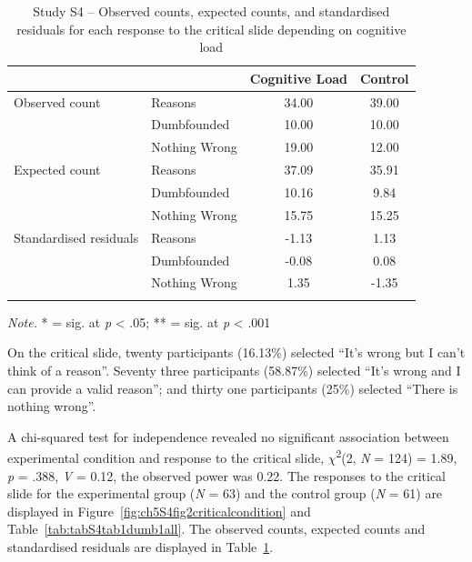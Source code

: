 \documentclass[
  man,floatsintext]{apa6}
\begin{document}
\begin{table}[tbp]

\begin{center}
\begin{threeparttable}

\caption{\label{tab:S4tab1dumb}Study S4 – Observed counts, expected counts, and standardised residuals for each response to the critical slide depending on cognitive load}

\begin{tabular}{llcc}
\toprule
 & \multicolumn{1}{c}{} & \multicolumn{1}{c}{Cognitive Load} & \multicolumn{1}{c}{Control}\\
\midrule
Observed count & Reasons & 34.00 & 39.00\\
 & Dumbfounded & 10.00 & 10.00\\
 & Nothing Wrong & 19.00 & 12.00\\
Expected count & Reasons & 37.09 & 35.91\\
 & Dumbfounded & 10.16 & 9.84\\
 & Nothing Wrong & 15.75 & 15.25\\
Standardised residuals & Reasons & -1.13 & 1.13\\
 & Dumbfounded & -0.08 & 0.08\\
 & Nothing Wrong & 1.35 & -1.35\\
\bottomrule
\addlinespace
\end{tabular}

\begin{tablenotes}[para]
\normalsize{\textit{Note.} * = sig. at \emph{p} < .05; ** = sig. at \emph{p} < .001}
\end{tablenotes}

\end{threeparttable}
\end{center}

\end{table}

On the critical slide, twenty participants (16.13\%) selected ``It's wrong but I can't think of a reason''. Seventy three participants (58.87\%) selected ``It's wrong and I can provide a valid reason''; and thirty one participants (25\%) selected ``There is nothing wrong''.

A chi-squared test for independence revealed no significant association between experimental condition and response to the critical slide, \(\chi\)\textsuperscript{2}(2, \emph{N} = 124) = 1.89, \emph{p} = .388, \emph{V} = 0.12, the observed power was 0.22. The responses to the critical slide for the experimental group (\emph{N} = 63) and the control group (\emph{N} = 61) are displayed in Figure~\ref{fig:ch5S4fig2criticalcondition} and Table~\ref{tab:tabS4tab1dumb1all}. The observed counts, expected counts and standardised residuals are displayed in Table~\ref{tab:S4tab1dumb}.
\end{document}
